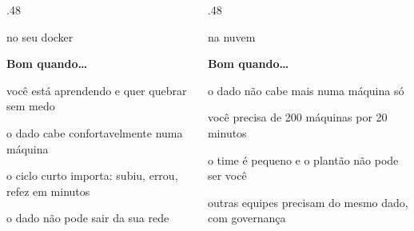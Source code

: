 \documentclass[aspectratio=169,11pt]{beamer}
\begin{document}
\begin{frame}
  \vspace{1mm}
  \begin{columns}[t,onlytextwidth]
    \begin{column}{.48\textwidth}
      \begin{lado}{no seu docker}
        {\bfseries\fontsize{11}{13}\selectfont\color{tinta}Bom quando\dots\par}
        \vspace{1mm}
        \begin{beneficios}
          \item você está aprendendo e quer quebrar sem medo
          \item o dado cabe confortavelmente numa máquina
          \item o ciclo curto importa: subiu, errou, refez em minutos
          \item o dado não pode sair da sua rede
        \end{beneficios}
      \end{lado}
    \end{column}
    \begin{column}{.48\textwidth}
      \begin{lado}{na nuvem}
        {\bfseries\fontsize{11}{13}\selectfont\color{tinta}Bom quando\dots\par}
        \vspace{1mm}
        \begin{beneficios}
          \item o dado não cabe mais numa máquina só
          \item você precisa de 200 máquinas por 20 minutos
          \item o time é pequeno e o plantão não pode ser você
          \item outras equipes precisam do mesmo dado, com governança
        \end{beneficios}
      \end{lado}
    \end{column}
  \end{columns}
\end{frame}
\end{document}
